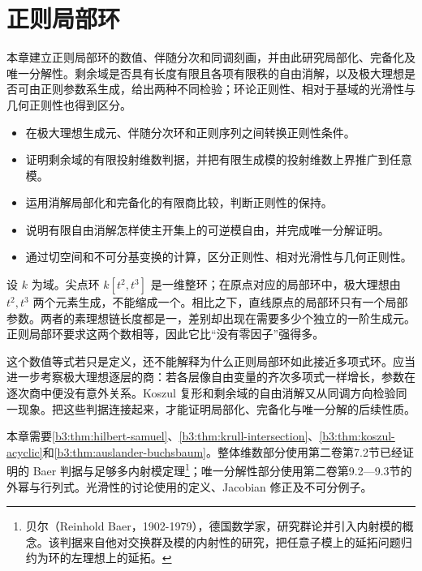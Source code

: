 
\chapter{正则局部环}
\label{b3:ch:18}

\begin{chapterabstract}
	本章建立正则局部环的数值、伴随分次和同调刻画，并由此研究局部化、完备化及唯一分解性。剩余域是否具有长度有限且各项有限秩的自由消解，以及极大理想是否可由正则参数系生成，给出两种不同检验；环论正则性、相对于基域的光滑性与几何正则性也得到区分。
\end{chapterabstract}

\begin{learninggoals}
	\begin{itemize}
		\item 在极大理想生成元、伴随分次环和正则序列之间转换正则性条件。
		\item 证明剩余域的有限投射维数判据，并把有限生成模的投射维数上界推广到任意模。
		\item 运用消解局部化和完备化的有限商比较，判断正则性的保持。
		\item 说明有限自由消解怎样使主开集上的可逆模自由，并完成唯一分解证明。
		\item 通过切空间和不可分基变换的计算，区分正则性、相对光滑性与几何正则性。
	\end{itemize}
\end{learninggoals}

设 \(k\) 为域。尖点环 \(k[t^2,t^3]\) 是一维整环；在原点对应的局部环中，极大理想由 \(t^2,t^3\) 两个元素生成，不能缩成一个。相比之下，直线原点的局部环只有一个局部参数。两者的素理想链长度都是一，差别却出现在需要多少个独立的一阶生成元。正则局部环要求这两个数相等，因此它比“没有零因子”强得多。

\ProseParagraphBreak

这个数值等式若只是定义，还不能解释为什么正则局部环如此接近多项式环。应当进一步考察极大理想逐层的商：若各层像自由变量的齐次多项式一样增长，参数在逐次商中便没有意外关系。Koszul 复形和剩余域的自由消解又从同调方向检验同一现象。把这些判据连接起来，才能证明局部化、完备化与唯一分解的后续性质。

\ProseParagraphBreak

本章需要\cref{b3:thm:hilbert-samuel}、\cref{b3:thm:krull-intersection}、\cref{b3:thm:koszul-acyclic}和\cref{b3:thm:auslander-buchsbaum}。整体维数部分使用第二卷第7.2节已经证明的 Baer 判据与足够多内射模定理\footnote{贝尔（Reinhold Baer，1902-1979），德国数学家，研究群论并引入内射模的概念。该判据来自他对交换群及模的内射性的研究，把任意子模上的延拓问题归约为环的左理想上的延拓。}；唯一分解性部分使用第二卷第9.2—9.3节的外幂与行列式。光滑性的讨论使用的定义、Jacobian 修正及不可分例子。

